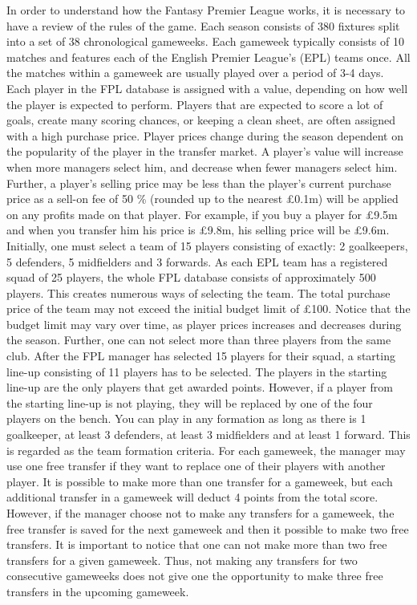 In order to understand how the Fantasy Premier League works, it is necessary to have a review of the rules of the game. Each season consists of 380 fixtures split into a set of 38 chronological gameweeks. Each gameweek typically consists of 10 matches and features each of the English Premier League's (EPL) teams once. All the matches within a gameweek are usually played over a period of 3-4 days.
\newpar
Each player in the FPL database is assigned with a value, depending on how well the player is expected to perform. Players that are expected to score a lot of goals, create many scoring chances, or keeping a clean sheet, are often assigned with a high purchase price. Player prices change during the season dependent on the popularity of the player in the transfer market. A player's value will increase when more managers select him, and decrease when fewer managers select him. Further, a player's selling price may be less than the player's current purchase price as a sell-on fee of 50 \% (rounded up to the nearest \pounds 0.1m) will be applied on any profits made on that player. For example, if you buy a player for \pounds 9.5m and when you transfer him his price is \pounds 9.8m, his selling price will be \pounds 9.6m.
\newpar
Initially, one must select a team of 15 players consisting of exactly: 2 goalkeepers, 5 defenders, 5 midfielders and 3 forwards. As each EPL team has a registered squad of 25 players, the whole FPL database consists of approximately 500 players. This creates numerous ways of selecting the team. The total purchase price of the team may not exceed the initial budget limit of £100. Notice that the budget limit may vary over time, as player prices increases and decreases during the season. Further, one can not select more than three players from the same club. After the FPL manager has selected 15 players for their squad, a starting line-up consisting of 11 players has to be selected. The players in the starting line-up are the only players that get awarded points. However, if a player from the starting line-up is not playing, they will be replaced by one of the four players on the bench. You can play in any formation as long as there is 1 goalkeeper, at least 3 defenders, at least 3 midfielders and at least 1 forward. This is regarded as the team formation criteria.
\newpar
For each gameweek, the manager may use one free transfer if they want to replace one of their players with another player. It is possible to make more than one transfer for a gameweek, but each additional transfer in a gameweek will deduct 4 points from the total score. However, if the manager choose not to make any transfers for a gameweek, the free transfer is saved for the next gameweek and then it possible to make two free transfers. It is important to notice that one can not make more than two free transfers for a given gameweek. Thus, not making any transfers for two consecutive gameweeks does not give one the opportunity to make three free transfers in the upcoming gameweek. 



